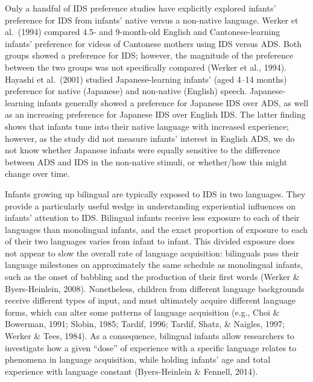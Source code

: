 \documentclass[
  english,
  ,man,floatsintext]{apa6}
\begin{document}
Only a handful of IDS preference studies have explicitly explored infants' preference for IDS from infants' native versus a non-native language. Werker et al.~(1994) compared 4.5- and 9-month-old English and Cantonese-learning infants' preference for videos of Cantonese mothers using IDS versus ADS. Both groups showed a preference for IDS; however, the magnitude of the preference between the two groups was not specifically compared (Werker et al., 1994). Hayashi et al.~(2001) studied Japanese-learning infants' (aged 4--14 months) preference for native (Japanese) and non-native (English) speech. Japanese-learning infants generally showed a preference for Japanese IDS over ADS, as well as an increasing preference for Japanese IDS over English IDS. The latter finding shows that infants tune into their native language with increased experience; however, as the study did not measure infants' interest in English ADS, we do not know whether Japanese infants were equally sensitive to the difference between ADS and IDS in the non-native stimuli, or whether/how this might change over time.

Infants growing up bilingual are typically exposed to IDS in two languages. They provide a particularly useful wedge in understanding experiential influences on infants' attention to IDS. Bilingual infants receive less exposure to each of their languages than monolingual infants, and the exact proportion of exposure to each of their two languages varies from infant to infant. This divided exposure does not appear to slow the overall rate of language acquisition: bilinguals pass their language milestones on approximately the same schedule as monolingual infants, such as the onset of babbling and the production of their first words (Werker \& Byers-Heinlein, 2008). Nonetheless, children from different language backgrounds receive different types of input, and must ultimately acquire different language forms, which can alter some patterns of language acquisition (e.g., Choi \& Bowerman, 1991; Slobin, 1985; Tardif, 1996; Tardif, Shatz, \& Naigles, 1997; Werker \& Tees, 1984). As a consequence, bilingual infants allow researchers to investigate how a given \enquote{dose} of experience with a specific language relates to phenomena in language acquisition, while holding infants' age and total experience with language constant (Byers-Heinlein \& Fennell, 2014).
\end{document}
